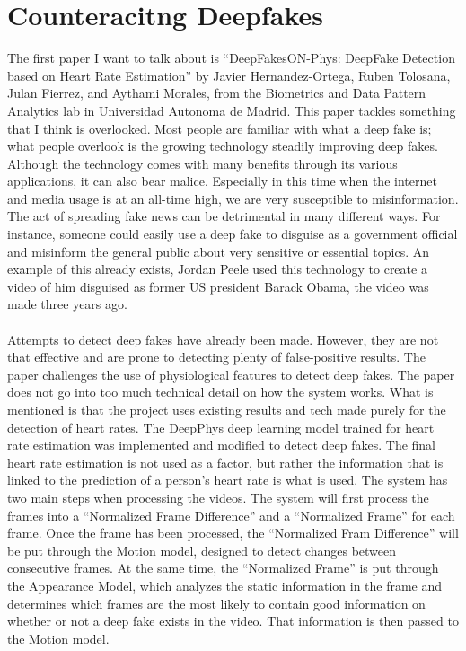 \documentclass[12pt,journal,compsoc]{IEEEtran}
\begin{document}
\section{Counteracitng Deepfakes}
The first paper I want to talk about is “DeepFakesON-Phys: DeepFake Detection based on Heart Rate Estimation” by Javier Hernandez-Ortega, Ruben Tolosana, Julan Fierrez, and Aythami Morales, from the Biometrics and Data Pattern Analytics lab in Universidad Autonoma de Madrid. This paper tackles something that I think is overlooked. Most people are familiar with what a deep fake is; what people overlook is the growing technology steadily improving deep fakes. Although the technology comes with many benefits through its various applications, it can also bear malice. Especially in this time when the internet and media usage is at an all-time high, we are very susceptible to misinformation. The act of spreading fake news can be detrimental in many different ways. For instance, someone could easily use a deep fake to disguise as a government official and misinform the general public about very sensitive or essential topics. An example of this already exists, Jordan Peele used this technology to create a video of him disguised as former US president Barack Obama, the video was made three years ago. \\\\
Attempts to detect deep fakes have already been made. However, they are not that effective and are prone to detecting plenty of false-positive results. The paper challenges the use of physiological features to detect deep fakes. The paper does not go into too much technical detail on how the system works. What is mentioned is that the project uses existing results and tech made purely for the detection of heart rates. The DeepPhys deep learning model trained for heart rate estimation was implemented and modified to detect deep fakes. The final heart rate estimation is not used as a factor, but rather the information that is linked to the prediction of a person’s heart rate is what is used. The system has two main steps when processing the videos. The system will first process the frames into a “Normalized Frame Difference” and a “Normalized Frame” for each frame. Once the frame has been processed, the “Normalized Fram Difference” will be put through the Motion model, designed to detect changes between consecutive frames. At the same time, the “Normalized Frame” is put through the Appearance Model, which analyzes the static information in the frame and determines which frames are the most likely to contain good information on whether or not a deep fake exists in the video. That information is then passed to the Motion model. \\\\
\end{document}

